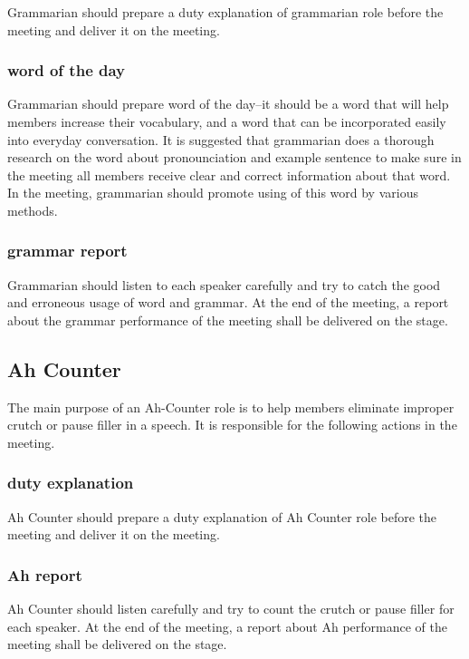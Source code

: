 Grammarian should prepare a duty explanation of grammarian role before the meeting and 
deliver it on the meeting.

\subsubsection{word of the day}

Grammarian should prepare word of the day--it should be a word that will help members 
increase their vocabulary, and a word that can be incorporated easily into everyday
conversation. It is suggested that grammarian does a thorough research on the word about
pronounciation and example sentence to make sure in the meeting all members receive  
clear and correct information about that word. In the meeting, grammarian should promote
using of this word by various methods.

\subsubsection{grammar report}

Grammarian should listen to each speaker carefully and try to catch the good and erroneous 
usage of word and grammar. At the end of the meeting, a report about the grammar performance
of the meeting shall be delivered on the stage.

\subsection{Ah Counter}

The main purpose of an Ah-Counter role is to help members eliminate improper crutch or pause 
filler in a speech. It is responsible for the following actions in the meeting.

\subsubsection{duty explanation}
Ah Counter should prepare a duty explanation of Ah Counter role before the meeting and 
deliver it on the meeting.

\subsubsection{Ah report}
Ah Counter should listen carefully and try to count the crutch or pause filler for each 
speaker. At the end of the meeting, a report about Ah performance of the meeting shall
be delivered on the stage.


